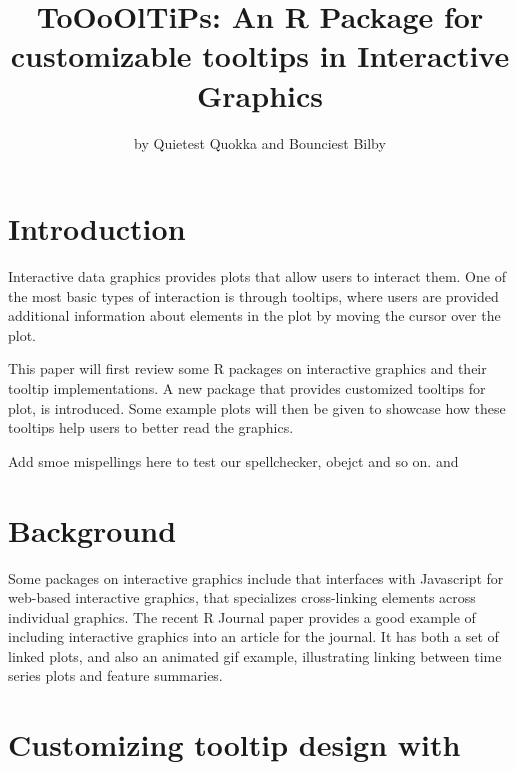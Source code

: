 \title{ToOoOlTiPs:
An R Package for customizable tooltips in Interactive
Graphics}
\author{by Quietest Quokka and Bounciest Bilby}

\maketitle

\hypertarget{introduction}{%
\section{Introduction}\label{introduction}}

Interactive data graphics provides plots that allow users to interact
them. One of the most basic types of interaction is through tooltips,
where users are provided additional information about elements in the
plot by moving the cursor over the plot.

This paper will first review some R packages on interactive graphics and
their tooltip implementations. A new package  that
provides customized tooltips for plot, is introduced. Some example plots
will then be given to showcase how these tooltips help users to better
read the graphics.

Add smoe mispellings here to test our spellchecker, obejct and so on.
 and 


\hypertarget{background}{%
\section{Background}\label{background}}

Some packages on interactive graphics include 
\citep{plotly} that interfaces with Javascript for web-based interactive
graphics,  \citep{crosstalk} that specializes
cross-linking elements across individual graphics. The recent R Journal
paper  \citep{RJ-2021-050} provides a good example
of including interactive graphics into an article for the journal. It
has both a set of linked plots, and also an animated gif example,
illustrating linking between time series plots and feature summaries.

\hypertarget{customizing-tooltip-design-with}{%
\section{\texorpdfstring{Customizing tooltip design with
}{Customizing tooltip design with }}\label{customizing-tooltip-design-with}}

